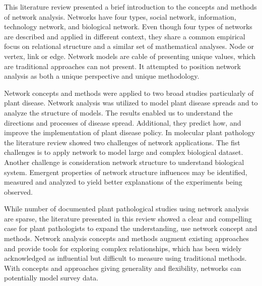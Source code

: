 This literature review presented a brief introduction to the concepts and methods of network analysis. Networks have four types, social network, information, technology network, and biological network. Even though four types of networks are described and applied in different context, they share a common empirical focus on relational structure and a similar set of mathematical analyses. Node or vertex, link or edge. Network models are cable of presenting unique values, which are traditional approaches can not present. It attempted to position network analysis as both a unique perspective and unique methodology.

Network concepts and methods were applied to two broad studies particularly of plant disease. Network analysis was utilized to model plant disease spreads and to analyze the structure of models. The results enabled us to understand the directions and processes of disease spread. Additional, they   predict how, and improve the implementation of plant disease policy. In molecular plant pathology the literature review showed two challenges of network applications. The fist challenges is to apply network to model large and complex biological dataset. Another challenge is consideration network structure to understand biological system. Emergent properties of network structure influences may be identified, measured and analyzed to yield better explanations of the experiments being observed.

While number of documented plant pathological studies using network analysis are sparse, the literature presented in this review showed a clear and compelling case for plant pathologists to expand the understanding, use network concept and methods. Network analysis concepts and methods augment existing approaches and provide tools for exploring complex relationships, which has been widely acknowledged as influential but difficult to measure using traditional methods. With concepts and approaches giving generality and flexibility, networks can potentially model survey data. 

